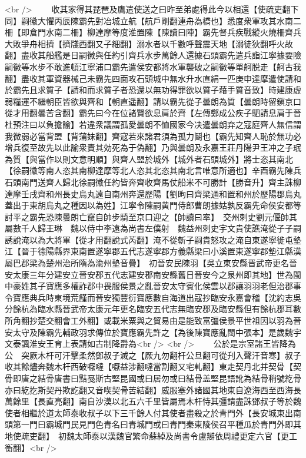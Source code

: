 <br />
　　收其家得其琵琶及鷹遣使送之曰昨至弟處得此今以相還【使疏吏翻下同】嗣徽大懼丙辰陳霸先對冶城立航【航戶剛翻連舟為橋也】悉度衆軍攻其水南二柵【即倉門水南二柵】柳達摩等度淮置陳【陳讀曰陣】霸先督兵疾戰縱火燒柵齊兵大敗爭舟相擠【擠牋西翻又子細翻】溺水者以千數呼聲震天地【溺徒狄翻呼火故翻】盡收其船艦是日嗣徽與任約引齊兵水步萬餘人還據石頭霸先遣兵詣江寧據要險嗣徽等水步不敢進頓江寧浦口霸先遣侯安都將水軍襲破之嗣徽等單舸脱走【舸古我翻】盡收其軍資器械己未霸先四面攻石頭城中無水升水直絹一匹庚申達摩遣使請和於霸先且求質子【請和而求質子者恐還以無功得罪欲以質子藉手質音致】時建康虚弱糧運不繼朝臣皆欲與齊和【朝直遥翻】請以霸先從子曇朗為質【曇朗時留鎭京口從才用翻曇苦含翻】霸先曰今在位諸賢欲息肩於齊【左傳鄭成公疾子駟請息肩于晉杜預注曰以負擔諭】若違衆議謂孤愛曇朗不恤國家今决遣曇朗弃之寇庭齊人無信謂我微弱必當背盟【背蒲妹翻】齊寇若來諸君須為孤力鬬也【霸先知齊人恥於無功必增兵復至故先以此諭衆責其効死為于偽翻】乃與曇朗及永嘉王莊丹陽尹王冲之子珉為質【與當作以則文意明順】與齊人盟於城外【城外者石頭城外】將士恣其南北【徐嗣徽等南人恣其南柳達摩等北人恣其北恣其南北言唯意所適也】辛酉霸先陳兵石頭南門送齊人歸北徐嗣徽任約皆奔齊收齊馬仗船米不可勝計【勝音升】齊主誅柳達摩壬戌齊和州長史烏丸遠自南州奔還歷陽【劉昫曰齊梁通和置和州於歷陽郡烏丸蓋出于東胡烏丸之種因以為姓】江寧令陳嗣黄門侍郎曹朗據姑孰反霸先命侯安都等討平之霸先恐陳曇朗亡竄自帥步騎至京口迎之【帥讀曰率】　交州刺史劉元偃帥其屬數千人歸王琳　魏以侍中李遠為尚書左僕射　魏益州刺史宇文貴使譙淹從子子嗣誘說淹以為大將軍【從才用翻說式芮翻】淹不從斬子嗣貴怒攻之淹自東遂寧徙屯墊江【晉于德陽縣界東南置遂寧郡五代志遂寧郡方義縣梁曰小溪置東遂寧郡墊江縣漢屬巴郡梁為楚州治所隋為渝州墊音疊】　初晉安民陳羽【吳立東安縣晋武帝更名晉安太康三年分建安立晉安郡五代志建安郡南安縣舊日晉安今之泉州即其地】世為閩中豪姓其子寶應多權詐郡中畏服侯景之亂晉安太守賓化侯雲以郡讓羽羽老但治郡事令寶應典兵時東境荒饉而晉安獨豐衍寶應數自海道出寇抄臨安永嘉會稽【沈約志吳分餘杭為臨水縣晉武帝太康元年更名臨安五代志無臨安郡及臨安縣但有餘杭郡耳數所角翻抄楚交翻會工外翻】或載米粟與之貿易由是能致富彊侯景平世祖因以羽為晉安太守及陳霸先輔政羽求傳位於寶應霸先許之【為後陳寶應亂閩中張本】是歲魏宇文泰諷淮安王育上表請如古制降爵為<br />
<br />
　　公於是宗室諸王皆降為公　突厥木杆可汗擊柔然鄧叔子滅之【厥九勿翻杆公旦翻可從刋入聲汗音寒】叔子收其餘燼奔魏木杆西破嚈噠【嚈益涉翻噠當割翻又宅軋翻】東走契丹北并契骨【契骨即唐之結骨唐書曰黠戞斯古堅昆國或曰居勿或曰結骨盖堅昆語訛為結骨稍號紇骨亦曰紇扢斯契丹欺訖翻又音喫契骨苦結翻】威服塞外諸國其地東自遼海西至西海長萬餘里【長直亮翻】南自沙漠以北五六千里皆屬焉木杆恃其彊請盡誅鄧叔子等於魏使者相繼於道太師泰收叔子以下三千餘人付其使者盡殺之於青門外【長安城東出南頭第一門曰霸城門民見門色青名曰青城門或曰青門秦東陵侯召平種瓜於青門外即其地使疏吏翻】　初魏太師泰以漢魏官繁命蘇綽及尚書令盧辯依周禮更定六官【更工衡翻】<br />
